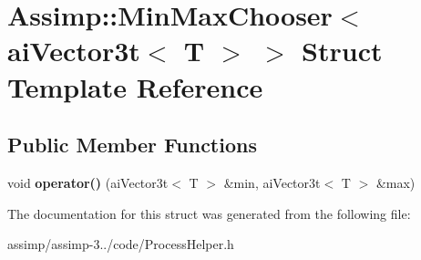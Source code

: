 \hypertarget{struct_assimp_1_1_min_max_chooser_3_01ai_vector3t_3_01_t_01_4_01_4}{\section{Assimp\+:\+:Min\+Max\+Chooser$<$ ai\+Vector3t$<$ T $>$ $>$ Struct Template Reference}
\label{struct_assimp_1_1_min_max_chooser_3_01ai_vector3t_3_01_t_01_4_01_4}
}
\subsection*{Public Member Functions}
\begin{DoxyCompactItemize}
\item 
\hypertarget{struct_assimp_1_1_min_max_chooser_3_01ai_vector3t_3_01_t_01_4_01_4_aa5ab59aa8a67640a60845f2f22b397e0}{void {\bfseries operator()} (ai\+Vector3t$<$ T $>$ \&min, ai\+Vector3t$<$ T $>$ \&max)}\label{struct_assimp_1_1_min_max_chooser_3_01ai_vector3t_3_01_t_01_4_01_4_aa5ab59aa8a67640a60845f2f22b397e0}

\end{DoxyCompactItemize}


The documentation for this struct was generated from the following file\+:\begin{DoxyCompactItemize}
\item 
assimp/assimp-\/3../code/Process\+Helper.\+h\end{DoxyCompactItemize}
